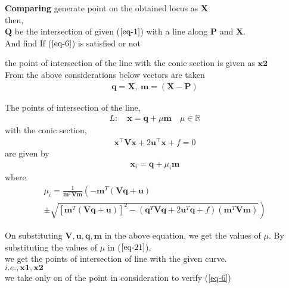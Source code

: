 \documentclass[journal,10pt,twocolumn]{article}
\let\vec\mathbf
\let\vec\mathbf
\providecommand{\brak}[1]{\ensuremath{\left(#1\right)}}
\providecommand{\brak}[1]{\ensuremath{\left(#1\right)}}
\providecommand{\lbrak}[1]{\ensuremath{\left(#1\right.}}
\providecommand{\rbrak}[1]{\ensuremath{\left.#1\right)}}
\providecommand{\sbrak}[1]{\ensuremath{{}\left[#1\right]}}
\begin{document}
\textbf{Comparing }
generate point on the obtained locus as $\vec{X}$\\
then,\\ $\vec{Q}$ be the intersection of given ($\ref{eq-1}$) with a line along $\vec{P}$ and $\vec{X}$. 
 \\And find If ($\ref{eq-6}$) is satisfied or not 

the point of intersection of the line with the conic section is given as $\vec{x2}$
\\

From the above considerations below vectors are taken
\begin{align}
\vec{q} = \vec{X} ,\: \vec{m}=(\vec{X-P})
\end{align}


The points of intersection of the line, \\ 
\begin{align}
L: \quad \vec{x} = \vec{q} + \mu \vec{m} \quad \mu \in \mathbb{R}
\end{align}
with the conic section, \\ 
\begin{align}
	\vec{x}^{\top}\vec{V}\vec{x} + 2\vec{u}^{\top} \vec{x} + f = 0
\end{align}
are given by \\
\begin{align}
\vec{x}_i = \vec{q} + \mu_i \vec{m}
\label{eq-21}
\end{align}
where
{\tiny
\begin{multline}
\mu_i = \frac{1}
{
\vec{m}^T\vec{V}\vec{m}
}
\lbrak{-\vec{m}^T\brak{\vec{V}\vec{q}+\vec{u}}}
\\
\pm
\rbrak{\sqrt{
\sbrak{
\vec{m}^T\brak{\vec{V}\vec{q}+\vec{u}}
}^2
-
\brak
{
\vec{q}^T\vec{V}\vec{q} + 2\vec{u}^T\vec{q} +f
}
\brak{\vec{m}^T\vec{V}\vec{m}}
}
}
\label{eq-22}
\end{multline}
}

\raggedright On substituting $\vec{V},\vec{u},\vec{q} ,\vec{m}$ in the above
equation,
we get the values of $\mu$. By substituting the values of $\mu$ in
($\ref{eq-21}$), \\we get the points of intersection of line with the given
curve. \\
\centering $i.e., \vec{x1},\vec{x2}$\\  we take only on of the point in consideration to verify (\ref{eq-6})
\end{document}
